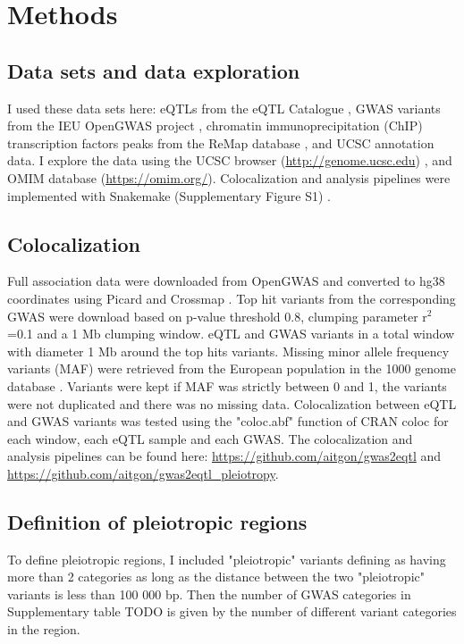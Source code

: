 \section*{Methods}\label{sec:methods}

\subsection*{Data sets and data exploration}

I used these data sets here: eQTLs from the eQTL Catalogue \cite{2021.Alasoo.Kerimov}, GWAS variants from the IEU OpenGWAS project \cite{2021.Marcora.Lyon}, chromatin immunoprecipitation (ChIP) transcription factors peaks from the ReMap database \cite{2021.Ballester.Hammal}, and UCSC annotation data.
%
I explore the data using the UCSC browser (\url{http://genome.ucsc.edu}) \cite{2021.Kent.Lee}, and OMIM database (\url{https://omim.org/}).
%
Colocalization and analysis pipelines were implemented with Snakemake (Supplementary Figure S1) .

\subsection*{Colocalization}

Full association data were downloaded from OpenGWAS and converted to hg38 coordinates using Picard and Crossmap \cite{2021.Marcora.Lyon,Picard2019toolkit,2013.Wang.Zhao}.
%
Top hit variants from the corresponding GWAS were download based on p-value threshold 0.8, clumping parameter r$^2$=0.1 and a 1 Mb clumping window.
%
eQTL and GWAS variants in a total window with diameter 1 Mb around the top hits variants.
%
Missing minor allele frequency variants (MAF) were retrieved from the European population in the 1000 genome database \cite{2015.Abecasis.Auton}.
%
Variants were kept if MAF was strictly between 0 and 1, the variants were not duplicated and there was no missing data.
%
Colocalization between eQTL and GWAS variants was tested using the "coloc.abf" function of CRAN coloc for each window, each eQTL sample and each GWAS.
%
The colocalization and analysis pipelines can be found here: \url{https://github.com/aitgon/gwas2eqtl} and \url{https://github.com/aitgon/gwas2eqtl_pleiotropy}.

\subsection*{Definition of pleiotropic regions}

To define pleiotropic regions, I included "pleiotropic" variants defining as having more than 2 categories as long as the distance between the two "pleiotropic" variants is less than 100 000 bp.
%
Then the number of GWAS categories in Supplementary table TODO is given by the number of different variant categories in the region.

